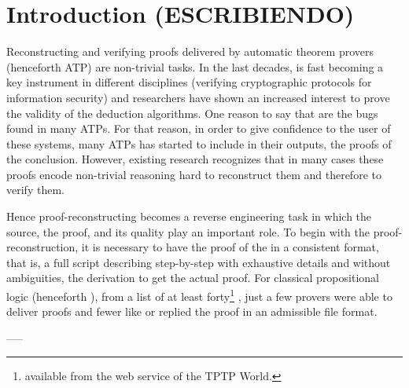 \documentclass[../main.tex]{subfiles}
\begin{document}

\section{Introduction (ESCRIBIENDO)}
\label{sec:introduction}

Reconstructing and verifying proofs delivered by automatic theorem provers
(henceforth ATP) are non-trivial tasks.
In the last decades, \ATPs is fast becoming a key instrument in 
different disciplines (\eg verifying cryptographic protocols for information security) and researchers have shown an increased interest to prove the validity of the deduction algorithms.
One reason to say that are the bugs found in many ATPs.
For that reason, in order to give confidence to the user of these systems,
many ATPs has started to include in their outputs, the proofs of the
conclusion. However, existing research recognizes that in many cases these proofs encode non-trivial reasoning
hard to reconstruct them and therefore to verify them.

Hence proof-reconstructing becomes a reverse engineering task
in which the source, the proof, and its quality play an important role.
To begin with the proof-reconstruction, it is necessary to have
the proof of the \ATP in a consistent format, that is, a full script 
describing step-by-step with exhaustive details and without ambiguities, the 
derivation to get the actual proof.  
For classical propositional logic (henceforth \CPL), from a list of at least forty\footnote{\ATPs 
available from the web
service  of the TPTP World.} \ATPs, just a few
provers were able to deliver proofs and fewer like  or \Metis 
replied the proof in an admissible file format.

-----








\end{document}
